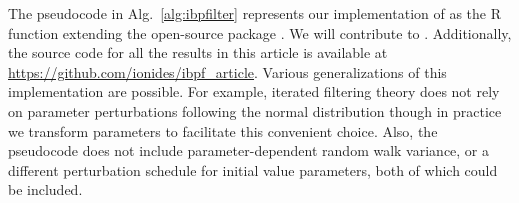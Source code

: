 \documentclass[12pt]{article}\usepackage[]{graphicx}\usepackage[]{xcolor}
\begin{document}
The pseudocode in Alg.~\ref{alg:ibpfilter} represents our implementation of {\ibpf} as the R function  extending the open-source package  \citep{asfaw21github,asfaw21arxiv}.
We will contribute  to .
Additionally, the source code for all the results in this article is available at \url{https://github.com/ionides/ibpf_article}.
Various generalizations of this implementation are possible.
For example, iterated filtering theory does not rely on parameter perturbations following the normal distribution \citep{ionides15} though in practice we transform parameters to facilitate this convenient choice.
Also, the pseudocode does not include parameter-dependent random walk variance, or a different perturbation schedule for initial value parameters, both of which could be included.

\end{document}
